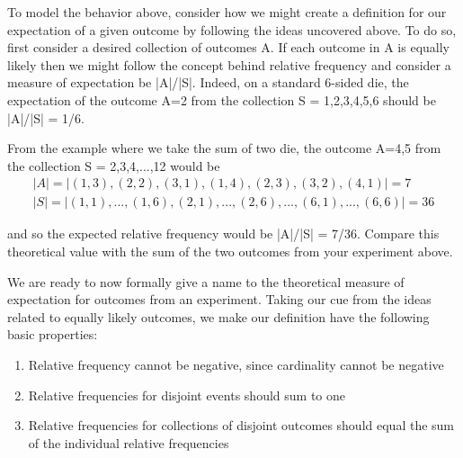 \documentclass[10pt,]{book}
\theoremstyle{plain}
\theoremstyle{definition}
\theoremstyle{definition}
\theoremstyle{definition}
\numberwithin{equation}{section}
\begin{document}
		To model the behavior above, consider how we might create a definition for our expectation
		of a given outcome by following the ideas uncovered above. To do so, first consider a desired collection
		of outcomes A. If each outcome in A is equally likely then we might follow the concept behind relative 
		frequency and consider a measure of expectation be |A|/|S|. Indeed, on a standard 
		6-sided die, the expectation of the outcome A={2} from the collection S = {1,2,3,4,5,6} should be
		|A|/|S| = 1/6.%
\par
From the example where we take the sum of two die, the outcome A={4,5} from the
		collection S = {2,3,4,...,12} would be%
\begin{gather*}
|A| = | {(1,3),(2,2),(3,1),(1,4),(2,3),(3,2),(4,1)}| = 7\\
|S| = | {(1,1),...,(1,6),(2,1),...,(2,6),...,(6,1),...,(6,6)}| = 36
\end{gather*}\par
and so the expected relative frequency would be |A|/|S| = 7/36. Compare this theoretical value
		with the sum of the two outcomes from your experiment above.%
\par
We are ready to now formally give a name to the theoretical measure of expectation for
		outcomes from an experiment. Taking our cue from the ideas related to equally likely outcomes, we 
		make our definition have the following basic properties:%
\leavevmode%
\begin{enumerate}
\item\hypertarget{li-106}{}Relative frequency cannot be negative, since cardinality cannot be negative%
\item\hypertarget{li-107}{}Relative frequencies for disjoint events should sum to one%
\item\hypertarget{li-108}{}Relative frequencies for collections of disjoint outcomes should equal the sum of the
		individual relative frequencies%
\end{enumerate}
\typeout{************************************************}
\typeout{************************************************}
\end{document}
